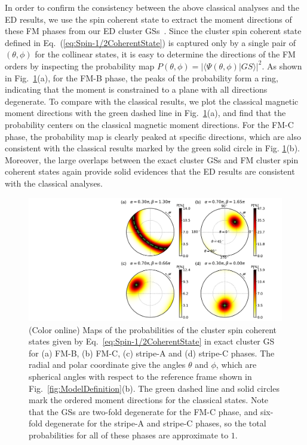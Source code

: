 \documentclass[aps,prb,reprint,amsfonts,amsmath,amssymb,showpacs,groupedaddress,superscriptaddress]{revtex4-1}
\begin{document}
In order to confirm the consistency between the above classical analyses and the ED results, we use the spin coherent state to extract the moment directions of these FM phases from our ED cluster GSs~\cite{PhysRevB.94.064435}. Since the cluster spin coherent state defined in Eq.~(\ref{eq:Spin-1/2CoherentState}) is captured only by a single pair of $(\theta, \phi)$ for the collinear states, it is easy to determine the directions of the FM orders by inspecting the probability map $P(\theta, \phi) = | \langle \Psi (\theta, \phi) | GS \rangle |^2$. As shown in Fig.~\ref{fig:Proabilities}(a), for the FM-B phase, the peaks of the probability form a ring, indicating that the moment is constrained to a plane with all directions degenerate. To compare with the classical results, we plot the classical magnetic moment directions with the green dashed line in Fig.~\ref{fig:Proabilities}(a), and find that the probability centers on the classical magnetic moment directions. For the FM-C phase, the probability map is clearly peaked at specific directions, which are also consistent with the classical results marked by the green solid circle in Fig. \ref{fig:Proabilities}(b). Moreover, the large overlaps between the exact cluster GSs and FM cluster spin coherent states again provide solid evidences that the ED results are consistent with the classical analyses.
\begin{figure}
    \centering
    \includegraphics[width=\columnwidth]{Probabilities.pdf}
    \caption{\label{fig:Proabilities}(Color online) Maps of the probabilities of the cluster spin coherent states given by Eq.~\eqref{eq:Spin-1/2CoherentState} in exact cluster GS for (a) FM-B, (b) FM-C, (c) stripe-A and (d) stripe-C phases. The radial and polar coordinate give the angles $\theta$ and $\phi$, which are spherical angles with respect to the reference frame shown in Fig.~\ref{fig:ModelDefinition}(b). The green dashed line and solid circles mark the ordered moment directions for the classical states. Note that the GSs are two-fold degenerate for the FM-C phase, and six-fold degenerate for the stripe-A and stripe-C phases, so the total probabilities for all of these phases are approximate to $1$. }
\end{figure}
\end{document}
